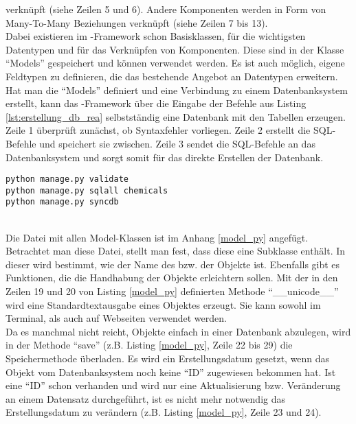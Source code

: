 verknüpft (siehe Zeilen 5 und 6). Andere Komponenten werden in Form von
Many-To-Many Beziehungen verknüpft (siehe Zeilen 7 bis 13).
\\
Dabei existieren im -Framework schon Basisklassen, für die
wichtigsten Datentypen und für das Verknüpfen von Komponenten. Diese sind in der
Klasse "`Models"' gespeichert und können verwendet werden. Es ist auch möglich,
eigene Feldtypen zu definieren, die das bestehende Angebot an
Datentypen erweitern.
\\
Hat man die "`Models"' definiert und eine Verbindung zu einem Datenbanksystem
erstellt, kann das -Framework über die Eingabe der Befehle aus
Listing \ref{lst:erstellung_db_rea} selbstständig eine Datenbank mit den
Tabellen erzeugen. Zeile 1 überprüft zunächst, ob Syntaxfehler vorliegen. Zeile
2 erstellt die \ac{SQL}-Befehle und speichert sie zwischen. Zeile 3 sendet die
\ac{SQL}-Befehle an das Datenbanksystem und sorgt somit für das direkte
Erstellen der Datenbank.
\begin{lstlisting}[caption={Befehlfolge zur Eingabe in ein Linux-Terminal
direkt auf dem Server zur Erstellung einer Datenbank in einem Datenbanksystem
mit allen Tabellen der APP chemicals
}, label=lst:erstellung_db_rea,captionpos=b]
python manage.py validate
python manage.py sqlall chemicals
python manage.py syncdb
\end{lstlisting}
\\
Die Datei mit allen Model-Klassen ist im Anhang \ref{model_py} angefügt.
Betrachtet man diese Datei, stellt man fest, dass diese eine Subklasse enthält.
In dieser wird bestimmt, wie der Name des bzw. der Objekte ist. Ebenfalls gibt
es Funktionen, die die Handhabung der Objekte erleichtern sollen. Mit der in den
Zeilen 19 und 20 von Listing \ref{model_py} definierten Methode
"`\_\_unicode\_\_"' wird eine Standardtextausgabe eines Objektes erzeugt. Sie kann
sowohl im Terminal, als auch auf Webseiten verwendet werden.
\\
Da es manchmal nicht reicht, Objekte einfach in einer Datenbank abzulegen, wird
in der Methode "`save"' (z.B. Listing \ref{model_py}, Zeile 22 bis 29) die
Speichermethode überladen. Es wird ein Erstellungsdatum gesetzt, wenn das Objekt
vom Datenbanksystem noch keine "`ID"' zugewiesen bekommen hat. Ist eine "`ID"' schon
verhanden und wird nur eine Aktualisierung bzw. Veränderung an einem
Datensatz durchgeführt, ist es nicht mehr notwendig das Erstellungsdatum zu
verändern (z.B. Listing \ref{model_py}, Zeile 23 und 24). 

